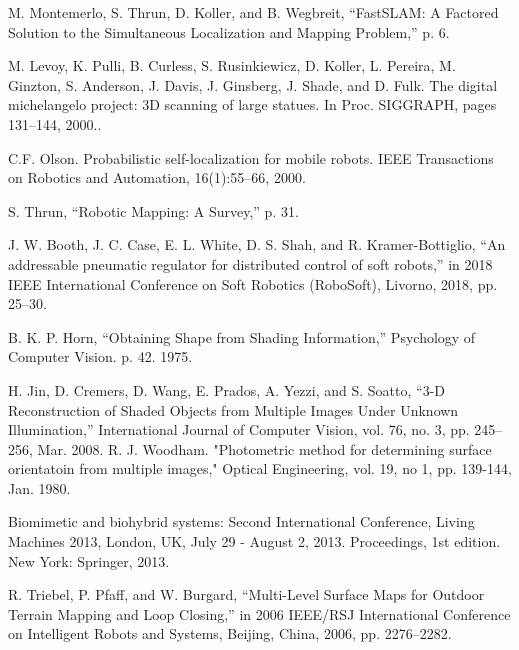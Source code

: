 \documentclass[letterpaper, 12 pt, conference]{ieeeconf}  %
\begin{document}
\begin{thebibliography}{99}

 M. Montemerlo, S. Thrun, D. Koller, and B. Wegbreit, “FastSLAM: A Factored Solution to the Simultaneous Localization and Mapping Problem,” p. 6.

 M. Levoy, K. Pulli, B. Curless, S. Rusinkiewicz, D. Koller, L. Pereira, M. Ginzton, S. Anderson, J. Davis, J. Ginsberg, J. Shade, and D. Fulk. The digital michelangelo project: 3D scanning of large statues. In Proc. SIGGRAPH, pages 131–144, 2000..

 C.F. Olson. Probabilistic self-localization for mobile robots. IEEE Transactions on Robotics and Automation, 16(1):55–66, 2000.

 S. Thrun, “Robotic Mapping: A Survey,” p. 31.

J. W. Booth, J. C. Case, E. L. White, D. S. Shah, and R. Kramer-Bottiglio, “An addressable pneumatic regulator for distributed control of soft robots,” in 2018 IEEE International Conference on Soft Robotics (RoboSoft), Livorno, 2018, pp. 25–30.

B. K. P. Horn, “Obtaining Shape from Shading Information,” Psychology of Computer Vision. p. 42. 1975. 

 H. Jin, D. Cremers, D. Wang, E. Prados, A. Yezzi, and S. Soatto, “3-D Reconstruction of Shaded Objects from Multiple Images Under Unknown Illumination,” International Journal of Computer Vision, vol. 76, no. 3, pp. 245–256, Mar. 2008.
 R. J. Woodham. "Photometric method for determining surface orientatoin from multiple images," Optical Engineering, vol. 19, no 1, pp. 139-144, Jan. 1980. 

 Biomimetic and biohybrid systems: Second International Conference, Living Machines 2013, London, UK, July 29 - August 2, 2013. Proceedings, 1st edition. New York: Springer, 2013.

 R. Triebel, P. Pfaff, and W. Burgard, “Multi-Level Surface Maps for Outdoor Terrain Mapping and Loop Closing,” in 2006 IEEE/RSJ International Conference on Intelligent Robots and Systems, Beijing, China, 2006, pp. 2276–2282.


\end{thebibliography}
\end{document}
